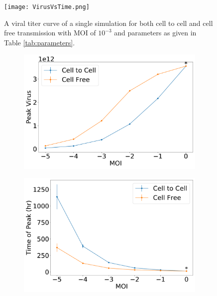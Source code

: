 \documentclass[a4paper]{article}
\begin{document}
\begin{figure}[h]
    \centering
    \texttt{[image: VirusVsTime.png]}
    \caption{A viral titer curve of a single simulation for both cell to cell and cell free transmission with MOI of $10^{-3}$ and parameters as given in Table \ref{tab:parameters}.}
    \label{fig:VirusVsTime}
\end{figure}

\begin{figure}[h]
    \centering
    \begin{subfigure}[b]{0.4\linewidth}
        \includegraphics[width=\linewidth]{Graphs/PeakViralTittervsMOI.pdf}
        \caption{}
        \label{fig:Peak_virus_of_both_transmission_modes}
    \end{subfigure}
    \begin{subfigure}[b]{0.4\linewidth}
        \includegraphics[width=\linewidth]{Graphs/PeakViralTitterTimevsMOI.pdf}

\end{subfigure}
\end{figure}
\end{document}
